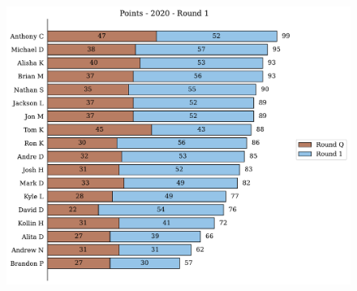 \documentclass[10pt]{article}
\begin{document}
\begin{minipage}[t]{13cm}
    \begin{figure}[H]
        \vspace{-3.5cm}
        \includegraphics[width=12cm]{../../figures/2020/Points-2020-Round1.pdf}
    \end{figure}
\end{minipage}
\end{document}
